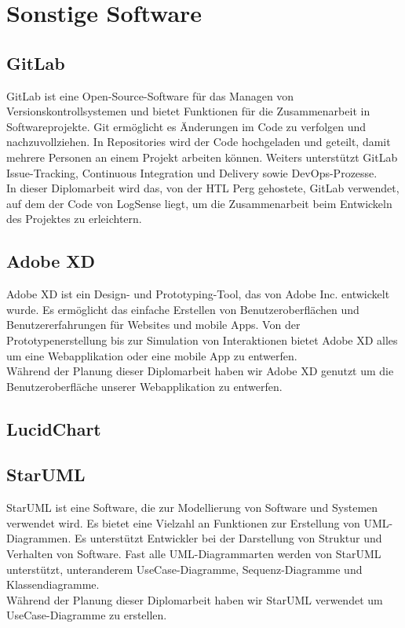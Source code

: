 \documentclass{report}
\begin{document}
\section{Sonstige Software}
\subsection{GitLab}
GitLab ist eine Open-Source-Software für das Managen von Versionskontrollsystemen und bietet Funktionen für die Zusammenarbeit in Softwareprojekte. Git ermöglicht es Änderungen im Code zu verfolgen und nachzuvollziehen. In Repositories wird der Code hochgeladen und geteilt, damit mehrere Personen an einem Projekt arbeiten können. Weiters unterstützt GitLab Issue-Tracking, Continuous Integration und Delivery sowie DevOps-Prozesse.
\\
In dieser Diplomarbeit wird das, von der HTL Perg gehostete, GitLab verwendet, auf dem der Code von LogSense liegt, um die Zusammenarbeit beim Entwickeln des Projektes zu erleichtern.
\subsection{Adobe XD}
Adobe XD ist ein Design- und Prototyping-Tool, das von Adobe Inc. entwickelt wurde. Es ermöglicht das einfache Erstellen von Benutzeroberflächen und Benutzererfahrungen für Websites und mobile Apps. Von der Prototypenerstellung bis zur Simulation von Interaktionen bietet Adobe XD alles um eine Webapplikation oder eine mobile App zu entwerfen. 
\\Während der Planung dieser Diplomarbeit haben wir Adobe XD genutzt um die Benutzeroberfläche unserer Webapplikation zu entwerfen.
\subsection{LucidChart}
\subsection{StarUML}
StarUML ist eine Software, die zur Modellierung von Software und Systemen verwendet wird. Es bietet eine Vielzahl an Funktionen zur Erstellung von UML-Diagrammen. Es unterstützt Entwickler bei der Darstellung von Struktur und Verhalten von Software. Fast alle UML-Diagrammarten werden von StarUML unterstützt, unteranderem UseCase-Diagramme, Sequenz-Diagramme und Klassendiagramme.
\\
Während der Planung dieser Diplomarbeit haben wir StarUML verwendet um UseCase-Diagramme zu erstellen.
\end{document}
